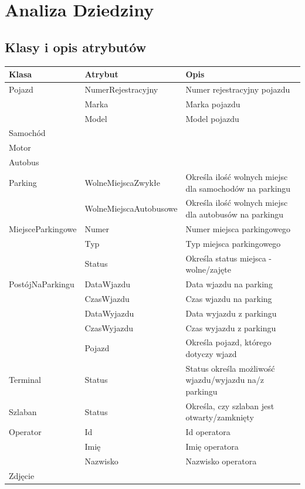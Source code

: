 \chapter{Analiza Dziedziny}
\label{cha:anDziedziny}

\section{Klasy i opis atrybutów}
\label{sec:klasyAtrybuty}
\begin{table}[H]
	\begin{tabular}{|l|l|l|} \hline
	\textbf{Klasa}	& \textbf{Atrybut} & \textbf{Opis} \\ \hline%
	Pojazd	& NumerRejestracyjny & Numer rejestracyjny pojazdu \\
	& Marka & Marka pojazdu \\
	& Model & Model pojazdu \\ \hline
	Samochód& & \\ \hline
	Motor& &  \\ \hline
	Autobus& & \\ \hline
	Parking	& WolneMiejscaZwykłe & Określa ilość wolnych miejsc dla samochodów na parkingu \\
	& WolneMiejscaAutobusowe & Określa ilość wolnych miejsc dla autobusów na parkingu \\ \hline
	MiejsceParkingowe	& Numer & Numer miejsca parkingowego \\
	& Typ & Typ miejsca parkingowego \\
	& Status & Określa status miejsca - wolne/zajęte \\ \hline
	PostójNaParkingu & DataWjazdu & Data wjazdu na parking\\
	& CzasWjazdu & Czas wjazdu na parking \\
	& DataWyjazdu & Data wyjazdu z parkingu\\
	& CzasWyjazdu & Czas wyjazdu z parkingu \\
	& Pojazd & Określa pojazd, którego dotyczy wjazd \\ \hline
	Terminal & Status & Status określa możliwość wjazdu/wyjazdu na/z parkingu \\ \hline
	Szlaban & Status & Określa, czy szlaban jest otwarty/zamknięty\\ \hline
	Operator& Id & Id operatora \\
	& Imię & Imię operatora \\
	& Nazwisko & Nazwisko operatora \\ \hline
	Zdjęcie& &  \\ \hline
	\end{tabular}
\end{table}


